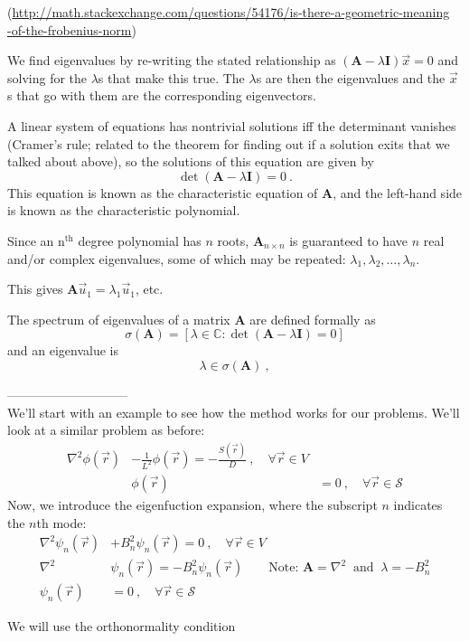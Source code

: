 \documentclass[12pt]{article}
\newcommand{\nth}{n\ensuremath{^{\text{th}}} }
\newcommand{\ve}[1]{\ensuremath{\mathbf{#1}}}
\begin{document}
(\url{http://math.stackexchange.com/questions/54176/is-there-a-geometric-meaning}\\ \url{-of-the-frobenius-norm})
 
We find eigenvalues by re-writing the stated relationship as $(\ve{A} - \lambda \ve{I})\vec{x}=0$ and solving for the $\lambda$s that make this true. The $\lambda$s are then the eigenvalues and the $\vec{x}$s that go with them are the corresponding eigenvectors. 

A linear system of equations has nontrivial solutions iff the determinant vanishes (Cramer's rule; related to the theorem for finding out if a solution exits that we talked about above), so the solutions of this equation are given by
%
\[\det(\ve{A} - \lambda \ve{I})=0 \:.\] 	
%
This equation is known as the characteristic equation of $\ve{A}$, and the left-hand side is known as the characteristic polynomial.

Since an \nth degree polynomial has $n$ roots, $\ve{A}_{n \times n}$ is guaranteed to have $n$ real and/or complex eigenvalues, some of which may be repeated: $\lambda_1, \lambda_2, \dots, \lambda_n$.

This gives $\ve{A}\vec{u}_1 = \lambda_1 \vec{u}_1$, etc.

The spectrum of eigenvalues of a matrix $\ve{A}$ are defined formally as
\[\sigma(\ve{A}) = [ \lambda \in \mathbb{C} : \det(\ve{A} - \lambda \ve{I})=0] \] 
and an eigenvalue is 
\[ \lambda \in \sigma(\ve{A})\:,\]

-----------------------------\\
We'll start with an example to see how the method works for our problems. We'll look at a similar problem as before:
\begin{align*}
\nabla^2\phi(\vec{r}) &- \frac{1}{L^2}\phi(\vec{r}) = -\frac{S(\vec{r})}{D} \:, \quad \forall \vec{r} \in V \\
& \phi(\vec{r}) &= 0\:, \quad \forall \vec{r} \in \mathcal{S}
\end{align*}
Now, we introduce the eigenfuction expansion, where the subscript $n$ indicates the $n$th mode:
\begin{align*}
\nabla^2 \psi_n (\vec{r}) &+ B_n^2 \psi_n (\vec{r}) = 0\:, \quad \forall \vec{r} \in V  \\
%
\nabla^2 &\psi_n (\vec{r}) =  -B_n^2 \psi_n (\vec{r}) \qquad \text{Note: } \ve{A} = \nabla^2\: \text{ and }\: \lambda = -B_n^2\\
\psi_n (\vec{r}) &= 0\:, \quad \forall \vec{r} \in \mathcal{S}
\end{align*}

We will use the orthonormality condition 
\end{document}

